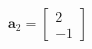 \documentclass[preview]{standalone}
\begin{document}
\begin{align*}
\mathbf{a}_2=\begin{bmatrix} 2 \\ -1 \end{bmatrix}
\end{align*}
\end{document}
